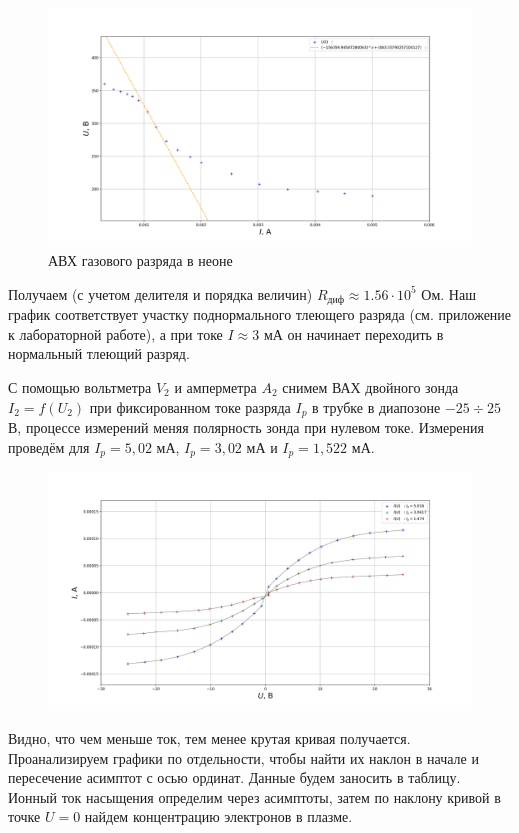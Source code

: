 \documentclass{lab}
\begin{document}
\begin{figure}[H]
    \centering
    \includegraphics[width = \textwidth]{graph1.png}
    \caption{АВХ газового разряда в неоне}
\end{figure}
Получаем (с учетом делителя и порядка величин) $R_{\text{диф}} \approx 1.56 \cdot 10^5$ Ом. Наш график соответствует участку поднормального тлеющего разряда (см. приложение к лабораторной работе), а при токе $I \approx 3$ мА он начинает переходить в нормальный тлеющий разряд.

С помощью вольтметра $V_2$ и амперметра $A_2$ снимем ВАХ двойного зонда $I_2 = f(U_2)$ при фиксированном токе разряда $I_p$ в трубке в диапозоне $-25 \div 25$ В, процессе измерений меняя полярность зонда при нулевом токе. Измерения проведём для $I_p = 5,02$ мА, $I_p = 3,02$ мА  и $I_p = 1,522$ мА.

\begin{figure}[H]
    \centering
    \includegraphics[width = \textwidth]{graph2.png}
\end{figure}

Видно, что чем меньше ток, тем менее крутая кривая получается. Проанализируем графики по отдельности, чтобы найти их наклон в начале и пересечение асимптот с осью ординат. Данные будем заносить в таблицу. Ионный ток насыщения определим через асимптоты, затем по наклону кривой в точке $U = 0$ найдем концентрацию электронов в плазме.
\end{document}
